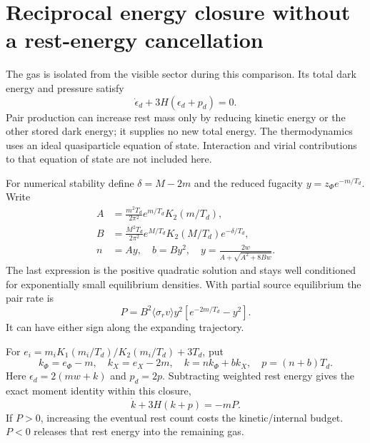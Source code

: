 \documentclass[11pt]{article}
\begin{document}
\section{Reciprocal energy closure without a rest-energy cancellation}
The gas is isolated from the visible sector during this comparison. Its
total dark energy and pressure satisfy
\begin{equation}
 \dot\epsilon_d+3H(\epsilon_d+p_d)=0.
\end{equation}
Pair production can increase rest mass only by reducing kinetic energy or
the other stored dark energy; it supplies no new total energy.
The thermodynamics uses an ideal quasiparticle equation of state. Interaction
and virial contributions to that equation of state are not included here.

For numerical stability define $\delta=M-2m$ and the reduced fugacity
$y=z_\Phi e^{-m/T_d}$. Write
\begin{align}
 A&=\frac{m^2T_d}{2\pi^2}e^{m/T_d}K_2(m/T_d),\\
 B&=\frac{M^2T_d}{2\pi^2}e^{M/T_d}K_2(M/T_d)e^{-\delta/T_d},\\
 n&=Ay,\quad b=By^2,\quad
 y=\frac{2w}{A+\sqrt{A^2+8Bw}}.
\end{align}
The last expression is the positive quadratic solution and stays well
conditioned for exponentially small equilibrium densities. With partial
source equilibrium the pair rate is
\begin{equation}
 P=B^2\langle\sigma_rv\rangle y^2
 [e^{-2m/T_d}-y^2].
\end{equation}
It can have either sign along the expanding trajectory.

For $e_i=m_iK_1(m_i/T_d)/K_2(m_i/T_d)+3T_d$, put
\begin{equation}
 k_\Phi=e_\Phi-m,\quad k_X=e_X-2m,\quad
 k=nk_\Phi+bk_X,\quad p=(n+b)T_d.
\end{equation}
Here $\epsilon_d=2(mw+k)$ and $p_d=2p$. Subtracting weighted rest energy
gives the exact moment identity within this closure,
\begin{equation}
 \dot k+3H(k+p)=-mP.
\end{equation}
If $P>0$, increasing the eventual rest count costs the kinetic/internal
budget. $P<0$ releases that rest energy into the remaining gas.
\end{document}
